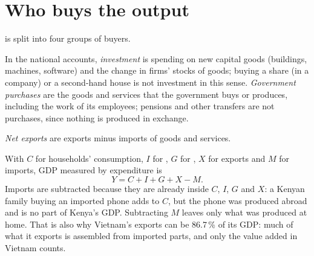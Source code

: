 \section{Who buys the output}\label{sec:g10:national-accounts:components}

 is split into four groups of buyers.

\begin{definition}\label{def:g10:national-accounts:investment}
In the national accounts, \emph{investment} is spending on new capital goods (buildings, machines, software) and the
change in firms' stocks of goods; buying a share (in a company) or a second-hand house is not investment in this sense. \emph{Government
purchases} are the goods and services that the government buys or produces, including the work of its employees; pensions and
other transfers are not purchases, since nothing is produced in exchange.
\end{definition}
\label{def:g10:national-accounts:government-purchases}

\begin{definition}\label{def:g10:national-accounts:net-exports}
\emph{Net exports} are exports minus imports of goods and services.
\end{definition}

With $C$ for households' consumption, $I$ for , $G$ for , $X$ for exports and $M$ for imports, GDP measured by expenditure is
\[
  Y = C + I + G + X - M .
\]
Imports are subtracted because they are already inside $C$, $I$, $G$ and $X$: a Kenyan family buying an imported phone adds to $C$, but the phone was produced
abroad and is no part of Kenya's GDP. Subtracting $M$ leaves only what was produced at home. That is also why Vietnam's exports can be 86.7\,\% of its GDP:
much of what it exports is assembled from imported parts, and only the value added in Vietnam counts.

